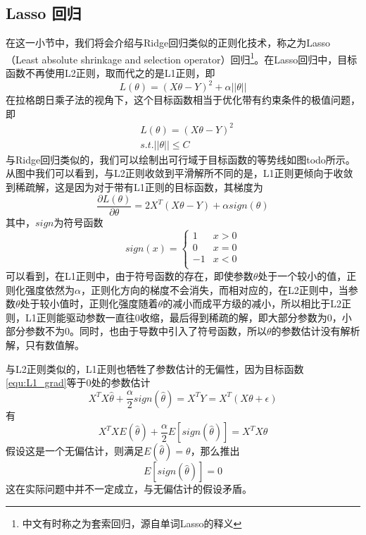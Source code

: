 \subsection{Lasso 回归} %
\label{sub:lasso_回归}
在这一小节中，我们将会介绍与Ridge回归类似的正则化技术，称之为Lasso（Least absolute shrinkage and selection operator）回归\footnote{中文有时称之为套索回归，源自单词Lasso的释义}。在Lasso回归中，目标函数不再使用L2正则，取而代之的是L1正则，即
\begin{equation}
	L(\theta) = (X\theta -Y)^2 + \alpha ||\theta||
\end{equation}
在拉格朗日乘子法的视角下，这个目标函数相当于优化带有约束条件的极值问题，即
\begin{equation}
	\begin{split}
		&L(\theta) = (X\theta -Y)^2 \\
		&s.t. ||\theta|| \leq C
	\end{split}
\end{equation}
与Ridge回归类似的，我们可以绘制出可行域于目标函数的等势线如图todo所示。从图中我们可以看到，与L2正则收敛到平滑解所不同的是，L1正则更倾向于收敛到稀疏解，这是因为对于带有L1正则的目标函数，其梯度为
\begin{equation}\label{equ:L1_grad}
	\frac{\partial L(\theta)}{\partial \theta} = 2X^T(X\theta - Y) + \alpha sign(\theta)
\end{equation}
其中，$sign$为符号函数
\begin{equation}
	sign(x) = \left\{\begin{array}{cc}
	1 &x > 0\\
	0 &x = 0\\
	-1 & x < 0\\
	\end{array}
	\right.
\end{equation}
可以看到，在L1正则中，由于符号函数的存在，即使参数$\theta$处于一个较小的值，正则化强度依然为$\alpha$，正则化方向的梯度不会消失，而相对应的，在L2正则中，当参数$\theta$处于较小值时，正则化强度随着$\theta$的减小而成平方级的减小，所以相比于L2正则，L1正则能驱动参数一直往0收缩，最后得到稀疏的解，即大部分参数为0，小部分参数不为0。同时，也由于导数中引入了符号函数，所以$\theta$的参数估计没有解析解，只有数值解。

与L2正则类似的，L1正则也牺牲了参数估计的无偏性，因为目标函数\ref{equ:L1_grad}等于0处的参数估计
\begin{equation}
	X^TX\hat{\theta}+\frac{\alpha}{2}sign(\hat{\theta}) = X^TY = X^T(X\theta + \epsilon)
\end{equation}
有
\begin{equation}
	X^TXE(\hat{\theta})+\frac{\alpha}{2} E[sign(\hat{\theta})] = X^TX\theta
\end{equation}
假设这是一个无偏估计，则满足$E(\hat{\theta})=\theta$，那么推出
\begin{equation}
	E[sign(\hat{\theta})] = 0 
\end{equation}
这在实际问题中并不一定成立，与无偏估计的假设矛盾。
	

